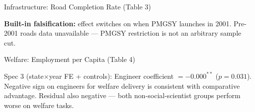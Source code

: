 \documentclass[aspectratio=169,10pt]{beamer}
\begin{document}
\begin{frame}{Infrastructure: Road Completion Rate (Table 3)}
  \begin{center}
  \end{center}
  \vspace{2pt}
  {\footnotesize \color{iasgray}
  \textbf{Built-in falsification:} effect switches on when PMGSY launches in 2001.
  Pre-2001 roads data unavailable — PMGSY restriction is not an arbitrary sample cut.}
\end{frame}

\begin{frame}{Welfare: Employment per Capita (Table 4)}
  \begin{center}
  \end{center}
  \vspace{4pt}
  {\footnotesize \color{iasgray}
  Spec 3 (state$\times$year FE + controls): Engineer coefficient $= -0.000^{**}$ ($p=0.031$).
  Negative sign on engineers for welfare delivery is consistent with comparative advantage.
  Residual also negative — both non-social-scientist groups perform worse on welfare tasks.}
\end{frame}
\end{document}
